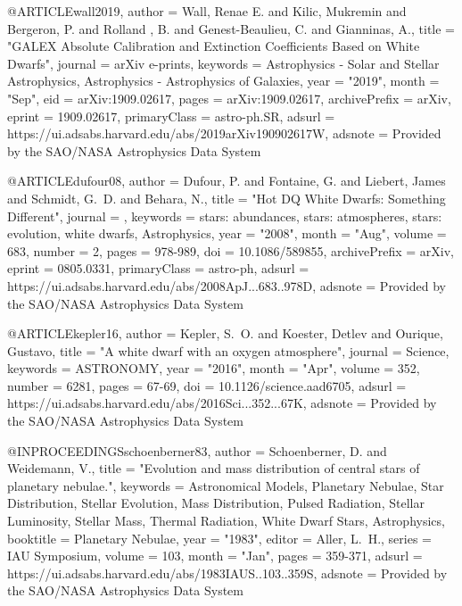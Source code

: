 \documentclass[a4paper,fleqn,usenatbib]{mnras}
\begin{document}
{{{{{{{{{{{@ARTICLE{wall2019,
       author = {{Wall}, Renae E. and {Kilic}, Mukremin and {Bergeron}, P. and {Rolland
        }, B. and {Genest-Beaulieu}, C. and {Gianninas}, A.},
        title = "{GALEX Absolute Calibration and Extinction Coefficients Based on White Dwarfs}",
      journal = {arXiv e-prints},
     keywords = {Astrophysics - Solar and Stellar Astrophysics, Astrophysics - Astrophysics of Galaxies},
         year = "2019",
        month = "Sep",
          eid = {arXiv:1909.02617},
        pages = {arXiv:1909.02617},
archivePrefix = {arXiv},
       eprint = {1909.02617},
 primaryClass = {astro-ph.SR},
       adsurl = {https://ui.adsabs.harvard.edu/abs/2019arXiv190902617W},
      adsnote = {Provided by the SAO/NASA Astrophysics Data System}
}


@ARTICLE{dufour08,
       author = {{Dufour}, P. and {Fontaine}, G. and {Liebert}, James and
         {Schmidt}, G.~D. and {Behara}, N.},
        title = "{Hot DQ White Dwarfs: Something Different}",
      journal = {\apj},
     keywords = {stars: abundances, stars: atmospheres, stars: evolution, white dwarfs, Astrophysics},
         year = "2008",
        month = "Aug",
       volume = {683},
       number = {2},
        pages = {978-989},
          doi = {10.1086/589855},
archivePrefix = {arXiv},
       eprint = {0805.0331},
 primaryClass = {astro-ph},
       adsurl = {https://ui.adsabs.harvard.edu/abs/2008ApJ...683..978D},
      adsnote = {Provided by the SAO/NASA Astrophysics Data System}
}

@ARTICLE{kepler16,
       author = {{Kepler}, S.~O. and {Koester}, Detlev and {Ourique}, Gustavo},
        title = "{A white dwarf with an oxygen atmosphere}",
      journal = {Science},
     keywords = {ASTRONOMY},
         year = "2016",
        month = "Apr",
       volume = {352},
       number = {6281},
        pages = {67-69},
          doi = {10.1126/science.aad6705},
       adsurl = {https://ui.adsabs.harvard.edu/abs/2016Sci...352...67K},
      adsnote = {Provided by the SAO/NASA Astrophysics Data System}
}

@INPROCEEDINGS{schoenberner83,
       author = {{Schoenberner}, D. and {Weidemann}, V.},
        title = "{Evolution and mass distribution of central stars of planetary nebulae.}",
     keywords = {Astronomical Models, Planetary Nebulae, Star Distribution, Stellar Evolution, Mass Distribution, Pulsed Radiation, Stellar Luminosity, Stellar Mass, Thermal Radiation, White Dwarf Stars, Astrophysics},
    booktitle = {Planetary Nebulae},
         year = "1983",
       editor = {{Aller}, L.~H.},
       series = {IAU Symposium},
       volume = {103},
        month = "Jan",
        pages = {359-371},
       adsurl = {https://ui.adsabs.harvard.edu/abs/1983IAUS..103..359S},
      adsnote = {Provided by the SAO/NASA Astrophysics Data System}
}

}}}}}}}}}}}
\end{document}
